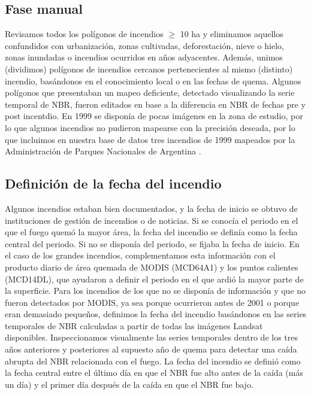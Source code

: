 \subsection{Fase manual}\label{append:mapeo-manual}

Revisamos todos los polígonos de incendios $\ge$ 10 ha y eliminamos aquellos confundidos con urbanización, zonas cultivadas, deforestación, nieve o hielo, zonas inundadas o incendios ocurridos en años adyacentes. Además, unimos (dividimos) polígonos de incendios cercanos pertenecientes al mismo (distinto) incendio, basándonos en el conocimiento local o en las fechas de quema. 
Algunos polígonos que presentaban un mapeo deficiente, detectado visualizando la serie temporal de NBR, fueron editados en base a la diferencia en NBR de fechas pre y post incentdio.
En 1999 se disponía de pocas imágenes en la zona de estudio, por lo que algunos incendios no pudieron mapearse con la precisión deseada, por lo que incluimos en nuestra base de datos tres incendios de 1999 mapeados por la Administración de Parques Nacionales de Argentina \citep{mermoz_deteccion_2002}.

\subsection{Definición de la fecha del incendio}\label{append:fire-dating}

Algunos incendios estaban bien documentados, y la fecha de inicio se obtuvo de instituciones de gestión de incendios o de noticias. Si se conocía el periodo en el que el fuego quemó la mayor área, la fecha del incendio se definía como la fecha central del periodo. Si no se disponía del periodo, se fijaba la fecha de inicio. En el caso de los grandes incendios, complementamos esta información con el producto diario de área quemada de MODIS (MCD64A1) y los puntos calientes (MCD14DL), que ayudaron a definir el periodo en el que ardió la mayor parte de la superficie. Para los incendios de los que no se disponía de información y que no fueron detectados por MODIS, ya sea porque ocurrieron antes de 2001 o porque eran demasiado pequeños, definimos la fecha del incendio basándonos en las series temporales de NBR calculadas a partir de todas las imágenes Landsat disponibles. Inspeccionamos visualmente las series temporales dentro de los tres años anteriores y posteriores al supuesto año de quema para detectar una caída abrupta del NBR relacionada con el fuego. La fecha del incendio se definió como la fecha central entre el último día en que el NBR fue alto antes de la caída (más un día) y el primer día después de la caída en que el NBR fue bajo.

